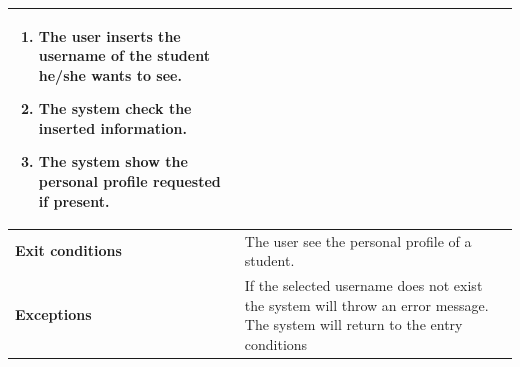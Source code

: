 \begin{enumerate}[label=\textbf{UC.\arabic*}]
\begin{table}[H]
\begin{tabular}{|m{3.2cm}|m{9.8cm}|}
\begin{enumerate}[label=\arabic*.]
                        \item The user inserts the username of the student he/she wants to see.
                        \item The system check the inserted information.
                        \item The system show the personal profile requested if present.
                    \end{enumerate}\\ 
                    \hline
                    \textbf{Exit conditions}  & The user see the personal profile of a student. \\
                    \hline
                    \textbf{Exceptions} & If the selected username does not exist the system will throw an error message. The system will return to the entry conditions \\
                    \hline
                \end{tabular}
        \end{table}
    \end{enumerate}
    


